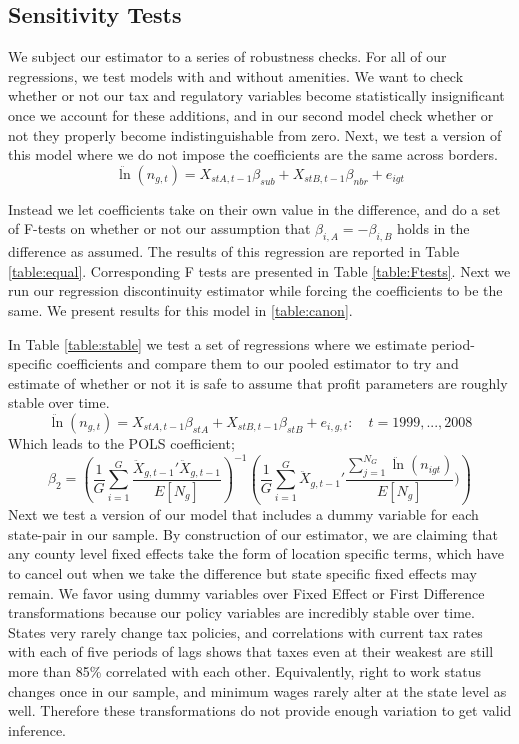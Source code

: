 \subsection{Sensitivity Tests}

We subject our estimator to a series of robustness checks. For all of our regressions, we test models with and without amenities. We want to check whether or not our tax and regulatory variables become statistically insignificant once we account for these additions, and in our second model check whether or not they properly become indistinguishable from zero. Next, we test a version of this model where we do not impose the coefficients are the same across borders.
\begin{equation}\label{sense1}
\ddot \ln(n_{g,t}) = X_{stA,t-1}\beta_{sub}+X_{stB,t-1}\beta_{nbr}+ e_{igt} 
\end{equation}

Instead we let coefficients take on their own value in the difference, and do a set of F-tests on whether or not our assumption that $\beta_{i,A} = -\beta_{i,B}$ holds in the difference as assumed. The results of this regression are reported in Table \ref{table:equal}. Corresponding F tests are presented in Table \ref{table:Ftests}. Next we run our regression discontinuity estimator while forcing the coefficients to be the same. We present results for this model in \ref{table:canon}.

In Table \ref{table:stable} we test a set of regressions where we estimate period-specific coefficients and compare them to our pooled estimator to try and estimate of whether or not it is safe to assume that profit parameters are roughly stable over time. 
\begin{equation}\label{sense2}
\ddot \ln(n_{g,t})  = X_{stA,t-1}\beta_{stA}+X_{stB,t-1}\beta_{stB}+ e_{i,g,t}: \quad t = 1999,...,2008
\end{equation}
Which leads to the POLS coefficient;
\begin{equation}
\hat \beta_{2} = \left(\frac{1}{G}\sum_{i=1}^{G}\frac{\ddot X_{g,t-1}'\ddot X_{g,t-1}}{E[N_{g}]}\right)^{-1}\left(\frac{1}{G}\sum_{i=1}^{G}\ddot X_{g,t-1}'\frac{\sum_{j=1}^{N_{G}}\ddot \ln(n_{igt})}{E[N_{g}]})\right)
\end{equation}
Next we test a version of our model that includes a dummy variable for each state-pair in our sample. By construction of our estimator, we are claiming that any county level fixed effects take the form of location specific terms, which have to cancel out when we take the difference but state specific fixed effects may remain. We favor using dummy variables over Fixed Effect or First Difference transformations because our policy variables are incredibly stable over time. States very rarely change tax policies, and correlations with current tax rates with each of five periods of lags shows that taxes even at their weakest are still more than 85\% correlated with each other. Equivalently, right to work status changes once in our sample, and minimum wages rarely alter at the state level as well. Therefore these transformations do not provide enough variation to get valid inference.

